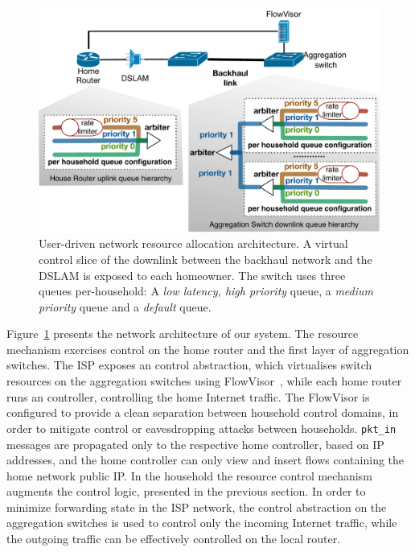 \begin{figure}
  \centering
  \includegraphics[width=0.7\columnwidth]{queue_design}
  \caption[User-driven QoS architecture]{User-driven network resource allocation architecture. 
    \label{fig:queue_design} A virtual control slice of the downlink between the backhaul
    network and the DSLAM is exposed to each homeowner.  The switch
    uses three queues per-household: A {\it low latency,
      high priority} \/queue, a {\it medium priority} \/queue and a {\it default}
    \/queue.}
\end{figure}

Figure~\ref{fig:queue_design} presents the network architecture of our system.
The resource mechanism exercises control on the home router and the first layer
of aggregation switches.  The ISP exposes an \of control abstraction, which
virtualises switch resources on the aggregation switches using
FlowVisor~, while each home router runs an \of controller,
controlling the home Internet traffic.  The FlowVisor is configured to provide a
clean separation between household control domains, in order to mitigate control
or eavesdropping attacks between households. \texttt{pkt\_in} messages are
propagated only to the respective home controller, based on IP addresses, and
the home controller can only view and insert flows containing the home network
public IP\@.   In the household the resource control mechanism augments the
control logic, presented in the previous section. In order to minimize
forwarding state in the ISP network, the control abstraction on the aggregation
switches is used to control only the incoming Internet traffic, while the
outgoing traffic can be effectively controlled on the local router. 

